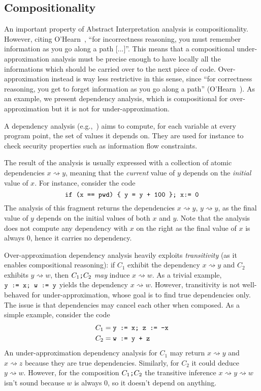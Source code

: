 \subsection*{Compositionality}
An important property of Abstract Interpretation analysis is compositionality. However, citing O'Hearn~\cite[§8]{OHearn20}, ``for incorrectness reasoning, you must remember information as you go along a path [...]''. This means that a compositional under-approximation analysis must be precise enough to have locally all the informations which should be carried over to the next piece of code. Over-approximation instead is way less restrictive in this sense, since ``for correctness reasoning, you get to forget information as you go along a path'' (O'Hearn~\cite[§8]{OHearn20}). As an example, we present dependency analysis, which is compositional for over-approximation but it is not for under-approximation.

\begin{example}
	A dependency analysis (e.g.,~\cite[\S 6]{ANSTT17}) aims to compute, for each variable at every program point, the set of values it depends on. They are used for instance to check security properties such as information flow constraints.

	The result of the analysis is usually expressed with a collection of atomic dependencies $x \rightsquigarrow y$, meaning that the \emph{current} value of $y$ depends on the \emph{initial} value of $x$.
	For instance, consider the code
	\[
	\texttt{if (x == pwd) \{ y = y + 100 \}; x:= 0}
	\]
	The analysis of this fragment returns the dependencies $x \rightsquigarrow y$, $y \rightsquigarrow y$, as the final value of $y$ depends on the initial values of both $x$ and $y$. Note that the analysis does not compute any dependency with $x$ on the right as the final value of $x$ is always $0$, hence it carries no dependency.

	Over-approximation dependency analysis heavily exploits \emph{transitivity} (as it enables compositional reasoning): if $C_1$ exhibit the dependency $x \rightsquigarrow y$ and $C_2$ exhibits $y \rightsquigarrow w$, then $C_1 \texttt{;} C_2$ \emph{may} induce $x \rightsquigarrow w$. As a trivial example, $\texttt{y := x; w := y}$ yields the dependency $x \rightsquigarrow w$.
	However, transitivity is not well-behaved for under-approximation, whose goal is to find true dependencies only. The issue is that dependencies may cancel each other when composed. As a simple example, consider the code
	\begin{align*}
		C_1 & = \texttt{y := x; z := -x} \\
		C_2 & = \texttt{w := y + z}
	\end{align*}
	An under-approximation dependency analysis for $C_1$ may return $x \rightsquigarrow y$ and $x \rightsquigarrow z$ because they are true dependencies. Similarly, for $C_2$ it could deduce $y \rightsquigarrow w$. However, for the composition $C_1 \texttt{;} C_2$ the transitive inference $x \rightsquigarrow y \rightsquigarrow w$ isn't sound because $w$ is always $0$, so it doesn't depend on anything.
\end{example}

